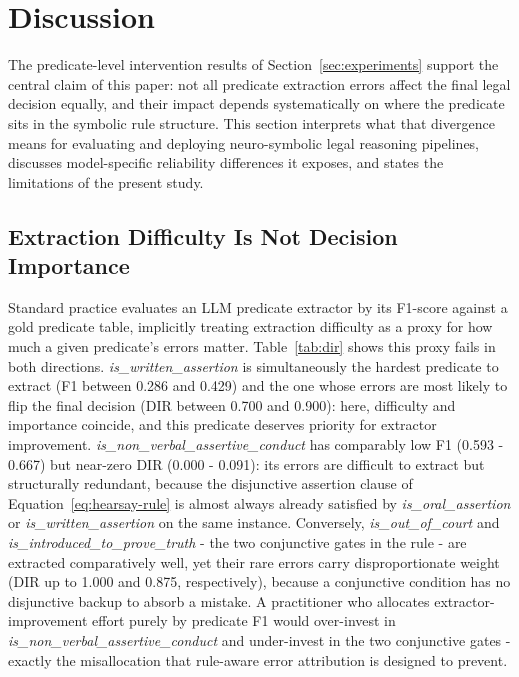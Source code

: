 \section{Discussion}
\label{sec:discussion}

The predicate-level intervention results of Section~\ref{sec:experiments} support the central claim of this paper: not all predicate extraction errors affect the final legal decision equally, and their impact depends systematically on where the predicate sits in the symbolic rule structure. This section interprets what that divergence means for evaluating and deploying neuro-symbolic legal reasoning pipelines, discusses model-specific reliability differences it exposes, and states the limitations of the present study.

\subsection{Extraction Difficulty Is Not Decision Importance}
\label{subsec:interpretation}
Standard practice evaluates an LLM predicate extractor by its F1-score against a gold predicate table, implicitly treating extraction difficulty as a proxy for how much a given predicate's errors matter\cite{tan2026diagnosing}. Table~\ref{tab:dir} shows this proxy fails in both directions. \textit{is\_written\_assertion} is simultaneously the hardest predicate to extract (F1 between 0.286 and 0.429) and the one whose errors are most likely to flip the final decision (DIR between 0.700 and 0.900): here, difficulty and importance coincide, and this predicate deserves priority for extractor improvement. \textit{is\_non\_verbal\_assertive\_conduct} has comparably low F1 (0.593 - 0.667) but near-zero DIR (0.000 - 0.091): its errors are difficult to extract but structurally redundant, because the disjunctive assertion clause of Equation~\ref{eq:hearsay-rule} is almost always already satisfied by \textit{is\_oral\_assertion} or \textit{is\_written\_assertion} on the same instance. Conversely, \textit{is\_out\_of\_court} and \textit{is\_introduced\_to\_prove\_truth} - the two conjunctive gates in the rule - are extracted comparatively well, yet their rare errors carry disproportionate weight (DIR up to 1.000 and 0.875, respectively), because a conjunctive condition has no disjunctive backup to absorb a mistake. A practitioner who allocates extractor-improvement effort purely by predicate F1 would over-invest in \textit{is\_non\_verbal\_assertive\_conduct} and under-invest in the two conjunctive gates - exactly the misallocation that rule-aware error attribution is designed to prevent.

